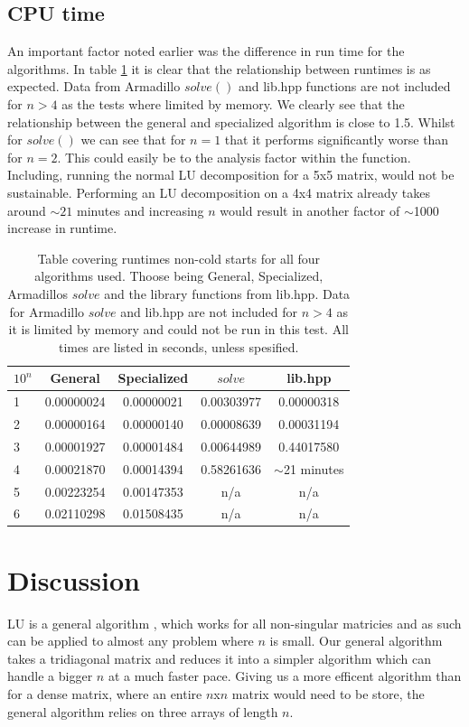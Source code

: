 \documentclass[10pt, a4paper]{amsart}
\begin{document}
\subsection{CPU time}
An important factor noted earlier was the difference in run time for the algorithms. In table \ref{tab:solver_times} it is clear that the relationship between runtimes is as expected. Data from Armadillo $solve()$ and lib.hpp functions are not included for $n>4$ as the tests where limited by memory. We clearly see that the relationship between the general and specialized algorithm is close to 1.5. Whilst for $solve()$ we can see that for $n=1$ that it performs significantly worse than for $n=2$. This could easily be to the analysis factor within the function. Including, running the normal LU decomposition for a 5x5 matrix, would not be sustainable. Performing an LU decomposition on a 4x4 matrix already takes around $\sim21$ minutes and increasing $n$ would result in another factor of $\sim$1000 increase in runtime. 
\begin{table}[h]
\caption{Table covering runtimes non-cold starts for all four algorithms used. Thoose being General, Specialized, Armadillos $solve$ and the library functions from lib.hpp. Data for Armadillo $solve$ and lib.hpp are not included for $n>4$ as it is limited by memory and could not be run in this test. All times are listed in seconds, unless spesified.}
\begin{tabular}{lcccc}
\hline
 $10^n$ & General & Specialized & $solve$ & lib.hpp \\ \hline
 1 & 0.00000024 & 0.00000021 & 0.00303977 & 0.00000318 \\
 2 & 0.00000164 & 0.00000140 & 0.00008639 & 0.00031194\\
 3 & 0.00001927 & 0.00001484 & 0.00644989 & 0.44017580\\
 4 & 0.00021870 & 0.00014394 & 0.58261636 & $\sim$21 minutes\\
 5 & 0.00223254 & 0.00147353 & n/a & n/a\\
 6 & 0.02110298 & 0.01508435 & n/a & n/a 
 \end{tabular}
\label{tab:solver_times}
\end{table}
\section{Discussion}
LU is a general algorithm , which works for all non-singular matricies and as such can be applied to almost any problem where $n$ is small. Our general algorithm takes a tridiagonal matrix and reduces it into a simpler algorithm which can handle a bigger $n$ at a much faster pace. Giving us a more efficent algorithm than for a dense matrix, where an entire $n$x$n$ matrix would need to be store, the general algorithm relies on three arrays of length $n$. 
\end{document}
